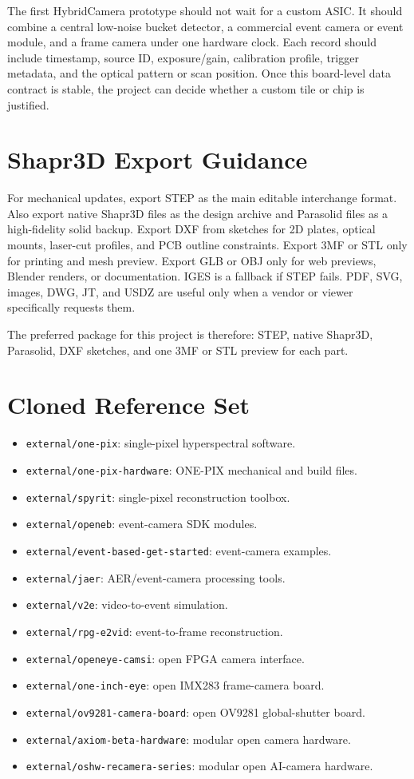 \documentclass[11pt]{article}
\begin{document}
The first HybridCamera prototype should not wait for a custom ASIC. It should
combine a central low-noise bucket detector, a commercial event camera or event
module, and a frame camera under one hardware clock. Each record should include
timestamp, source ID, exposure/gain, calibration profile, trigger metadata, and
the optical pattern or scan position. Once this board-level data contract is
stable, the project can decide whether a custom tile or chip is justified.

\section{Shapr3D Export Guidance}

For mechanical updates, export STEP as the main editable interchange format.
Also export native Shapr3D files as the design archive and Parasolid files as a
high-fidelity solid backup. Export DXF from sketches for 2D plates, optical
mounts, laser-cut profiles, and PCB outline constraints. Export 3MF or STL only
for printing and mesh preview. Export GLB or OBJ only for web previews, Blender
renders, or documentation. IGES is a fallback if STEP fails. PDF, SVG, images,
DWG, JT, and USDZ are useful only when a vendor or viewer specifically requests
them.

The preferred package for this project is therefore: STEP, native Shapr3D,
Parasolid, DXF sketches, and one 3MF or STL preview for each part.

\section{Cloned Reference Set}

\begin{itemize}
\item \texttt{external/one-pix}: single-pixel hyperspectral software.
\item \texttt{external/one-pix-hardware}: ONE-PIX mechanical and build files.
\item \texttt{external/spyrit}: single-pixel reconstruction toolbox.
\item \texttt{external/openeb}: event-camera SDK modules.
\item \texttt{external/event-based-get-started}: event-camera examples.
\item \texttt{external/jaer}: AER/event-camera processing tools.
\item \texttt{external/v2e}: video-to-event simulation.
\item \texttt{external/rpg-e2vid}: event-to-frame reconstruction.
\item \texttt{external/openeye-camsi}: open FPGA camera interface.
\item \texttt{external/one-inch-eye}: open IMX283 frame-camera board.
\item \texttt{external/ov9281-camera-board}: open OV9281 global-shutter board.
\item \texttt{external/axiom-beta-hardware}: modular open camera hardware.
\item \texttt{external/oshw-recamera-series}: modular open AI-camera hardware.
\end{itemize}
\end{document}
